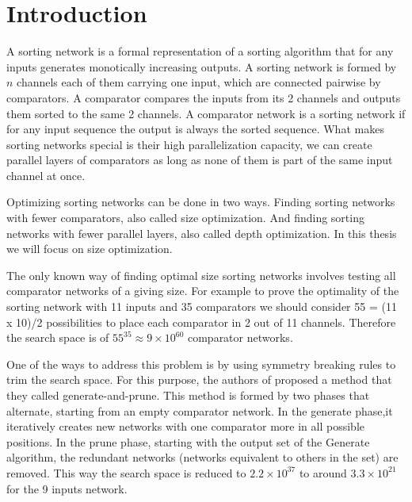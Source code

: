 \documentclass[../main.tex]{subfiles}
\begin{document}
\section{Introduction}
A sorting network is a formal representation of a sorting algorithm that for any inputs generates
monotically increasing outputs. A sorting network is formed by $n$ channels each of them carrying one input,
which are connected pairwise by comparators. A comparator compares the inputs from its 2 channels and 
outputs them sorted to the same 2 channels. A comparator network is a sorting network if for any 
input sequence the output is always the sorted sequence. What makes sorting networks special is their
high parallelization capacity, we can create parallel layers of comparators as long as none of them is part of
the same input channel at once.

Optimizing sorting networks can be done in two ways. Finding sorting networks with fewer comparators,
also called size optimization. And finding sorting networks with fewer parallel layers, also called depth optimization.
In this thesis we will focus on size optimization.

The only known way of finding optimal size sorting networks involves testing all comparator networks of a giving size. 
For example to prove the optimality of the sorting network
with 11 inputs and 35 comparators we should consider 55 = (11 x 10)/2 possibilities to place each comparator in 2 out of 11 channels. Therefore the search space is of $55^{35} \approx 9 \times 10^{60}$ comparator networks. 

One of the ways to address this problem is by using symmetry breaking rules to trim the search space. For this purpose, the authors of \cite{sortingnineinputs} proposed a method that they called generate-and-prune. This method is formed by two phases that alternate, starting from an empty comparator network.
In the generate phase,it iteratively creates new networks with one comparator more in all possible positions. In the prune phase, starting with the output set of the Generate algorithm, the redundant networks (networks equivalent to others in the set) are removed. This way the search space is reduced to $2.2 \times 10^{37}$ to around $3.3 \times 10^{21}$ for the 9 inputs network.
\end{document}
